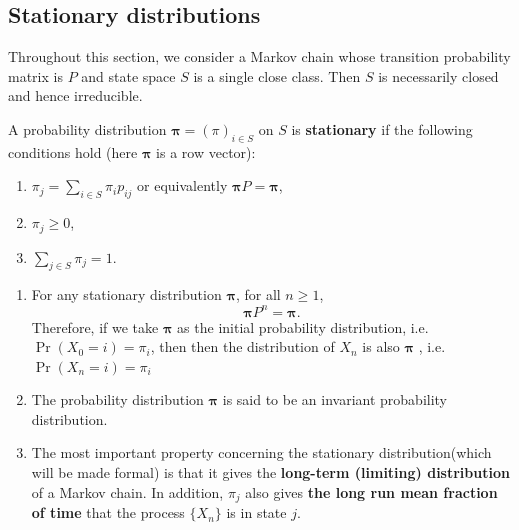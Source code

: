 \documentclass[
]{book}
\theoremstyle{definition}
\theoremstyle{definition}
\theoremstyle{definition}
\theoremstyle{definition}
\theoremstyle{remark}
\begin{document}
\hypertarget{stationary-distributions}{%
\subsection*{Stationary distributions}\label{stationary-distributions}}

Throughout this section, we consider a Markov chain whose transition
probability matrix is \(P\) and state space \(S\) is a single close class.
Then \(S\) is necessarily closed and hence irreducible.

A probability distribution \(\boldsymbol{\pi} = (\pi)_{i \in S}\) on \(S\)
is \textbf{stationary} if the following conditions hold (here
\(\boldsymbol{\pi}\) is a row vector):

\begin{enumerate}
\def\labelenumi{\arabic{enumi}.}
\item
  \(\pi_j = \sum_{i \in S} \pi_i p_{ij}\) or equivalently
  \(\boldsymbol{\pi} P =\boldsymbol{\pi}\),
\item
  \(\pi_j \ge 0\),
\item
  \(\sum_{j \in S} \pi_j = 1\).
\end{enumerate}

\begin{enumerate}
\def\labelenumi{\arabic{enumi}.}
\item
  For any stationary distribution \(\boldsymbol{\pi}\), for all
  \(n \ge 1\), \[\boldsymbol{\pi}  P^n  =\boldsymbol{\pi}.\] Therefore,
  if we take \(\boldsymbol{\pi}\) as the initial probability
  distribution, i.e.~\(\Pr(X_0 = i) = \pi_i\), then then the
  distribution of \(X_n\) is also \(\boldsymbol{\pi}\) , i.e.
  \(\Pr(X_n = i) = \pi_i\)
\item
  The probability distribution \(\boldsymbol{\pi}\) is said to be an
  invariant probability distribution.
\item
  The most important property concerning the stationary
  distribution(which will be made formal) is that it gives the
  \textbf{long-term (limiting) distribution} of a Markov chain. In
  addition, \(\pi_j\) also gives \textbf{the long run mean fraction of time}
  that the process \(\{X_n\}\) is in state \(j\).
\end{enumerate}
\end{document}
